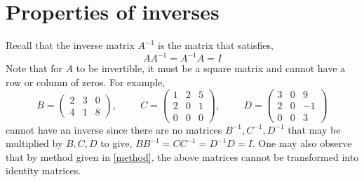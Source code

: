 \documentclass{ximera}
\begin{document}
\section*{Properties of inverses}
Recall that the inverse matrix $A^{-1}$ is the matrix that satisfies,
\begin{equation*}
AA^{-1}= A^{-1}A= I
\end{equation*}
Note that for $A$ to be invertible, it must be a square matrix and cannot have a row or column of zeros. For example,
 \[B= \left(\begin{array}{ccc}
  2 &  3 & 0 \\
  4 &  1 & 8
\end{array}\right), \hspace{1cm} C= \left(\begin{array}{ccc}
  1 &  2 & 5 \\
  2 &  0 & 1 \\
  0 & 0& 0
\end{array}\right), \hspace{1cm} D = \left(\begin{array}{ccc}
  3 &  0 & 9 \\
  2 &  0 & -1 \\
  0 & 0& 3
\end{array}\right)
\]
cannot have an inverse since there are no matrices $B^{-1}, C^{-1}, D^{-1}$ that may be multiplied by $B,C,D$ to give, $BB^{-1}= CC^{-1}=D^{-1}D=I$. One may also observe that by method given in \eqref{method}, the above matrices cannot be transformed into identity matrices.
\end{document}

